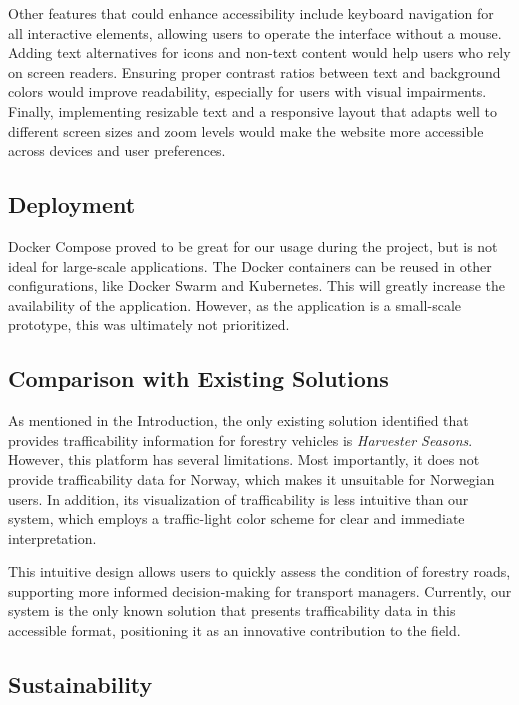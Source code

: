 Other features that could enhance accessibility include keyboard navigation for all interactive elements, allowing users to operate the interface without a mouse. Adding text alternatives for icons and non-text content would help users who rely on screen readers. Ensuring proper contrast ratios between text and background colors would improve readability, especially for users with visual impairments. Finally, implementing resizable text and a responsive layout that adapts well to different screen sizes and zoom levels would make the website more accessible across devices and user preferences.

\subsection{Deployment}

Docker Compose proved to be great for our usage during the project, but is not ideal for large-scale applications. The Docker containers can be reused in other configurations, like Docker Swarm and Kubernetes. This will greatly increase the availability of the application. However, as the application is a small-scale prototype, this was ultimately not prioritized. 

\subsection{Comparison with Existing Solutions}

As mentioned in the Introduction, the only existing solution identified that provides trafficability information for forestry vehicles is \textit{Harvester Seasons}. However, this platform has several limitations. Most importantly, it does not provide trafficability data for Norway, which makes it unsuitable for Norwegian users. In addition, its visualization of trafficability is less intuitive than our system, which employs a traffic-light color scheme for clear and immediate interpretation.

This intuitive design allows users to quickly assess the condition of forestry roads, supporting more informed decision-making for transport managers. Currently, our system is the only known solution that presents trafficability data in this accessible format, positioning it as an innovative contribution to the field.

\subsection{Sustainability}\label{subsec:discussion:product:sustainability}

